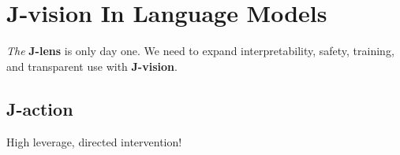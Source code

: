 \documentclass{article}
\begin{document}









\section{J-vision In Language Models}\label{jvizllm}
\textit{The} \textbf{J-lens} is only day one. We need to expand interpretability, safety, training, and transparent use with \textbf{J-vision}. 
\subsection{J-action}
High leverage, directed intervention!
\end{document}
